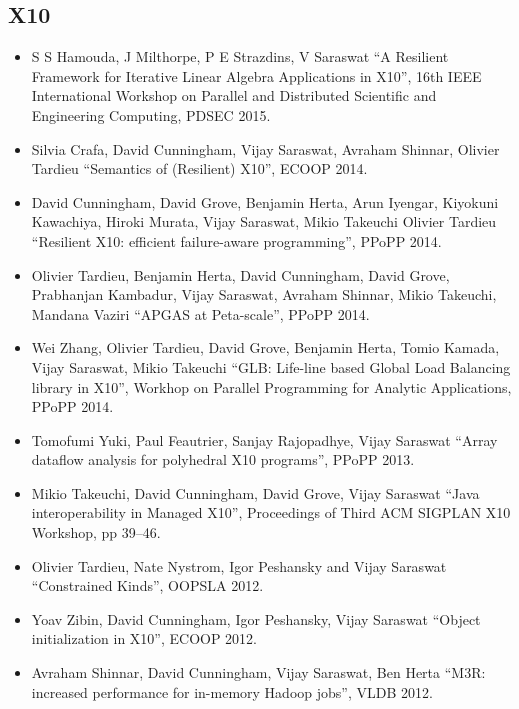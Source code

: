 \documentclass{article}
\begin{document}
\subsection*{X10}
\begin{itemize}
\item S S Hamouda, J Milthorpe, P E Strazdins, V Saraswat ``A
  Resilient Framework for Iterative Linear Algebra Applications in
  X10'', 16th IEEE International Workshop on Parallel and Distributed
  Scientific and Engineering Computing, PDSEC 2015.

\item Silvia Crafa, David Cunningham, Vijay Saraswat, Avraham Shinnar,
  Olivier Tardieu ``Semantics of (Resilient) X10'', ECOOP 2014.

\item David Cunningham, David Grove, Benjamin Herta, Arun Iyengar,
  Kiyokuni Kawachiya, Hiroki Murata, Vijay Saraswat, Mikio Takeuchi
  Olivier Tardieu ``Resilient X10: efficient failure-aware
  programming'', PPoPP 2014. 

\item Olivier Tardieu, Benjamin Herta, David Cunningham, David Grove,
  Prabhanjan Kambadur, Vijay Saraswat, Avraham Shinnar, Mikio
  Takeuchi, Mandana Vaziri ``APGAS at Peta-scale'', PPoPP 2014.


\item Wei Zhang, Olivier Tardieu, David Grove, Benjamin Herta, Tomio
  Kamada, Vijay Saraswat, Mikio Takeuchi  ``GLB: Life-line based
  Global Load Balancing library in X10'', Workhop on Parallel
  Programming for Analytic Applications, PPoPP 2014.
\item Tomofumi Yuki, Paul Feautrier, Sanjay Rajopadhye, Vijay Saraswat
  ``Array dataflow analysis for polyhedral X10 programs'', PPoPP 2013.
\item Mikio Takeuchi, David Cunningham, David Grove, Vijay Saraswat ``Java
interoperability in Managed X10'', Proceedings of Third ACM SIGPLAN
X10 Workshop, pp 39--46. 

\item Olivier Tardieu, Nate Nystrom, Igor Peshansky and Vijay Saraswat
  ``Constrained Kinds'', OOPSLA 2012.
\item Yoav Zibin, David Cunningham, Igor Peshansky, Vijay Saraswat
  ``Object initialization in X10'', ECOOP 2012.

\item Avraham Shinnar, David Cunningham, Vijay Saraswat, Ben Herta
  ``M3R: increased performance for in-memory Hadoop jobs'', VLDB
  2012. 


\end{itemize}
\end{document}
